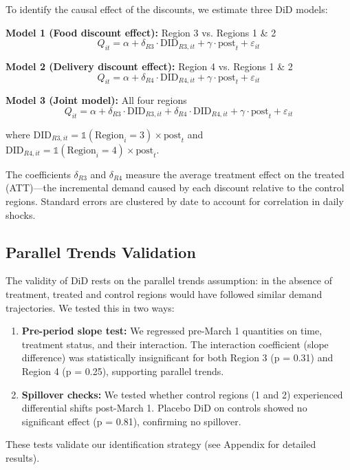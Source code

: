 \documentclass[12pt]{article}
\begin{document}
To identify the causal effect of the discounts, we estimate three DiD models:

\textbf{Model 1 (Food discount effect):} Region 3 vs. Regions 1 \& 2
\[
Q_{it} = \alpha + \delta_{R3} \cdot \text{DID}_{R3,it} + \gamma \cdot \text{post}_t + \varepsilon_{it}
\]

\textbf{Model 2 (Delivery discount effect):} Region 4 vs. Regions 1 \& 2
\[
Q_{it} = \alpha + \delta_{R4} \cdot \text{DID}_{R4,it} + \gamma \cdot \text{post}_t + \varepsilon_{it}
\]

\textbf{Model 3 (Joint model):} All four regions
\[
Q_{it} = \alpha + \delta_{R3} \cdot \text{DID}_{R3,it} + \delta_{R4} \cdot \text{DID}_{R4,it} + \gamma \cdot \text{post}_t + \varepsilon_{it}
\]

where $\text{DID}_{R3,it} = \mathbb{1}(\text{Region}_i = 3) \times \text{post}_t$ and $\text{DID}_{R4,it} = \mathbb{1}(\text{Region}_i = 4) \times \text{post}_t$.

The coefficients $\delta_{R3}$ and $\delta_{R4}$ measure the average treatment effect on the treated (ATT)—the incremental demand caused by each discount relative to the control regions. Standard errors are clustered by date to account for correlation in daily shocks.

\subsection{Parallel Trends Validation}

The validity of DiD rests on the parallel trends assumption: in the absence of treatment, treated and control regions would have followed similar demand trajectories. We tested this in two ways:

\begin{enumerate}[nosep]
    \item \textbf{Pre-period slope test:} We regressed pre-March 1 quantities on time, treatment status, and their interaction. The interaction coefficient (slope difference) was statistically insignificant for both Region 3 (p = 0.31) and Region 4 (p = 0.25), supporting parallel trends.
    \item \textbf{Spillover checks:} We tested whether control regions (1 and 2) experienced differential shifts post-March 1. Placebo DiD on controls showed no significant effect (p = 0.81), confirming no spillover.
\end{enumerate}

These tests validate our identification strategy (see Appendix for detailed results).
\end{document}
